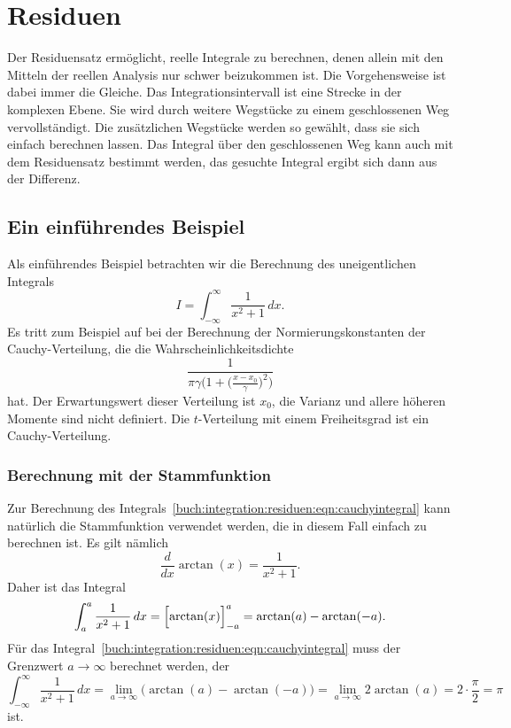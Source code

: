 %
%
%
\section{Residuen
\label{buch:integration:section:residuen}}
Der Residuensatz ermöglicht, reelle Integrale zu berechnen, denen 
allein mit den Mitteln der reellen Analysis nur schwer beizukommen
ist.
Die Vorgehensweise ist dabei immer die Gleiche.
Das Integrationsintervall ist eine Strecke in der komplexen Ebene.
Sie wird durch weitere Wegstücke zu einem geschlossenen Weg
vervollständigt.
Die zusätzlichen Wegstücke werden so gewählt, dass sie sich
einfach berechnen lassen.
Das Integral über den geschlossenen Weg kann auch mit dem Residuensatz
bestimmt werden, das gesuchte Integral ergibt sich dann aus der Differenz.

%
%
\subsection{Ein einführendes Beispiel
\label{buch:integration:residuen:section:beispiel}}
%
Als einführendes Beispiel betrachten wir die Berechnung des uneigentlichen
Integrals
\begin{equation}
I
=
\int_{-\infty}^\infty \frac{1}{x^2+1} \,dx.
\label{buch:integration:residuen:eqn:cauchyintegral}
\end{equation}
Es tritt zum Beispiel auf bei der Berechnung der Normierungskonstanten
der Cauchy-Verteilung, die die Wahrscheinlichkeitsdichte
\[
\frac{1}{\pi\gamma
\biggl(
\displaystyle
1+\biggl(\frac{x-x_0}{\gamma}\biggr)^2
\biggr)}
\]
hat.
Der Erwartungswert dieser Verteilung ist $x_0$, die Varianz und allere
höheren Momente sind nicht definiert.
Die $t$-Verteilung mit einem Freiheitsgrad ist ein Cauchy-Verteilung.

%
%
\subsubsection{Berechnung mit der Stammfunktion}
Zur Berechnung des
Integrals~\eqref{buch:integration:residuen:eqn:cauchyintegral}
kann natürlich die Stammfunktion verwendet werden, die in diesem
Fall einfach zu berechnen ist.
Es gilt nämlich
\[
\frac{d}{dx}\arctan(x)
=
\frac{1}{x^2 + 1}.
\]
Daher ist das Integral
\[
\int_a^a
\frac{1}{x^2+1}
\,dx
=
\Bigl[
\arctan(x)
\Bigr]_{-a}^a
=
\arctan(a) - \arctan(-a).
\]
Für das
Integral~\eqref{buch:integration:residuen:eqn:cauchyintegral}
muss der Grenzwert $a\to\infty$ berechnet werden, der
\[
\int_{-\infty}^\infty \frac{1}{x^2+1} \,dx
=
\lim_{a\to\infty}
\bigl(
\arctan(a) -\arctan(-a)
\bigr)
=
\lim_{a\to\infty} 2\arctan(a)
=
2\cdot\frac{\pi}2
=
\pi
\]
ist.

